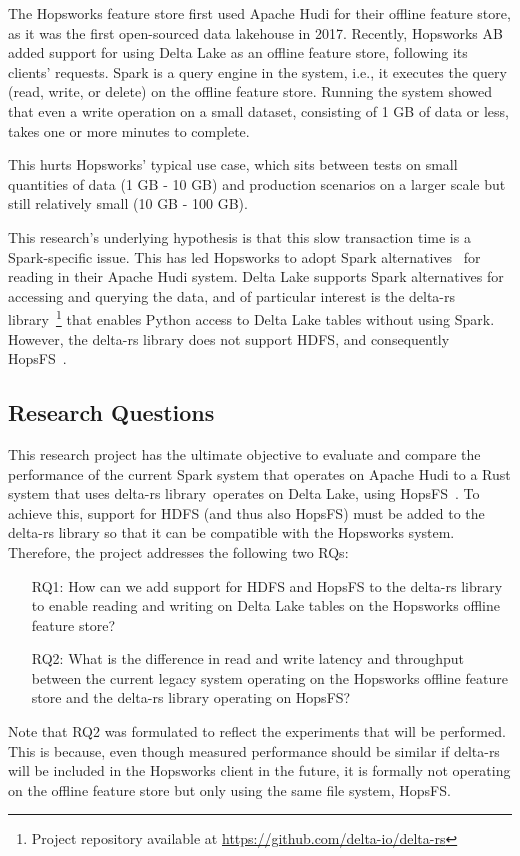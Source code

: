 The Hopsworks feature store \cite{10.1145/3626246.3653389} first used Apache Hudi for their offline feature store, as it was the first open-sourced data lakehouse in 2017. Recently, Hopsworks \gls{AB} added support for using Delta Lake as an offline feature store, following its clients' requests. Spark is a query engine in the system, i.e., it executes the query (read, write, or delete) on the offline feature store. Running the system showed that even a write operation on a small dataset, consisting of 1 GB of data or less, takes one or more minutes to complete.

This hurts Hopsworks' typical use case, which sits between tests on small quantities of data (1 GB - 10 GB) and production scenarios on a larger scale but still relatively small (10 GB - 100 GB).

This research's underlying hypothesis is that this slow transaction time is a Spark-specific issue. This has led Hopsworks to adopt Spark alternatives~\cite{Khazanchi1801362} for reading in their Apache Hudi system. Delta Lake supports Spark alternatives for accessing and querying the data, and of particular interest is the delta-rs library~\footnote{Project repository available at \url{https://github.com/delta-io/delta-rs}} that enables Python access to Delta Lake tables without using Spark. 
However, the delta-rs library does not support \gls{HDFS}, and consequently \gls{HopsFS}~\cite{niaziHopsFSScalingHierarchical2017}.

\subsection{Research Questions}
\label{subsec:researchQuestion}
This research project has the ultimate objective to evaluate and compare the performance of the current Spark system that operates on Apache Hudi to a Rust system that uses delta-rs library~\footnotemark[\value{footnote}] operates on Delta Lake, using \gls{HopsFS}~\cite{niaziHopsFSScalingHierarchical2017}. To achieve this, support for \gls{HDFS} (and thus also \gls{HopsFS}) must be added to the delta-rs library so that it can be compatible with the Hopsworks system. Therefore, the project addresses the following two \glspl{RQ}:
\begin{enumerate}
    \item[RQ1:] How can we add support for \gls{HDFS} and \gls{HopsFS} to the delta-rs library to enable reading and writing on Delta Lake tables on the Hopsworks offline feature store?
    \item[RQ2:] What is the difference in read and write latency and throughput between the current legacy system operating on the Hopsworks offline feature store and the delta-rs library operating on HopsFS?
\end{enumerate}
Note that RQ2 was formulated to reflect the experiments that will be performed. This is because, even though measured performance should be similar if delta-rs will be included in the Hopsworks client in the future, it is formally not operating on the offline feature store but only using the same file system, \gls{HopsFS}.

